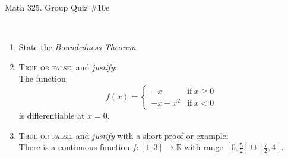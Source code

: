 \documentclass[12pt]{amsart}
\newcommand{\R}{\mathbb{R}}
\begin{document}
	
	\thispagestyle{empty}
	
	\begin{center}
		\Large{Math 325. Group Quiz \#10e }\\

	\end{center}
	
	\
	
\begin{enumerate}
		\item State the \textit{Boundedness Theorem}. 
		\vfill
		\vfill



\item  \textsc{True or false}, and \emph{justify}:\\
 The function 
 \[ f(x) = \begin{cases} - x & \text{if} \ x\geq 0 \\ -x - x^2 & \text{if} \ x<0 \end{cases}\]
	is differentiable at $x=0$.
	
	
	\vfill	\vfill\vfill
	

\newpage	
	
\item  \textsc{True or false}, and \emph{justify} with a short proof or example:\\
There is a continuous function $f: [1,3] \to \R$ with range $[0,\frac{5}{2}] \cup [\frac{7}{2},4]$.

\vfill\vfill\vfill





\end{enumerate}


	
\end{document}
